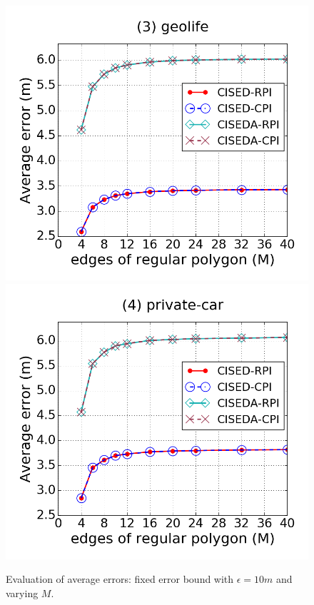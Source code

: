 \begin{figure}[tb!]
\includegraphics[scale = 0.250]{figures/Exp-M-e-10-error-geolife.png}
\includegraphics[scale = 0.250]{figures/Exp-M-e-10-error-private.png}
\vspace{-2ex}
\caption{\small Evaluation of average errors: fixed error bound with $\epsilon = 10m$ and varying $M$.}
\label{fig:m-error-e20}
\vspace{-2ex}
\end{figure}


